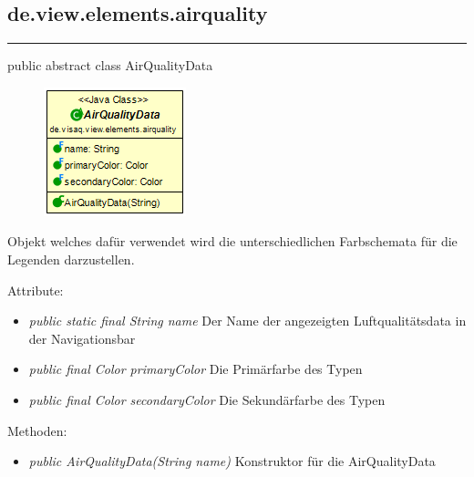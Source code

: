 
\subsection{de.view.elements.airquality}

\rule{\textwidth}{0.4pt} 
public abstract class AirQualityData

\begin{minipage}{0.3\textwidth}
    \begin{figure}[H]
        \includegraphics[scale = 0.6]{media/frontend/view/de.view.elements.airquality/AirQualityData_Class.png}
    \end{figure}
    \end{minipage} \hfill
    \begin{minipage}{0.6\textwidth}
Objekt welches dafür verwendet wird die unterschiedlichen Farbschemata für die Legenden darzustellen.
\end{minipage}

Attribute:
\begin{itemize} 
    \item \emph{public static final String name} Der Name der angezeigten Luftqualitätsdata in der Navigationsbar
    \item \emph{public final Color primaryColor} Die Primärfarbe des Typen 
	\item \emph{public final Color secondaryColor} Die Sekundärfarbe des Typen
\end{itemize}
Methoden:
\begin{itemize} 
    \item \emph{public AirQualityData(String name)} Konstruktor für die AirQualityData
\end{itemize}

